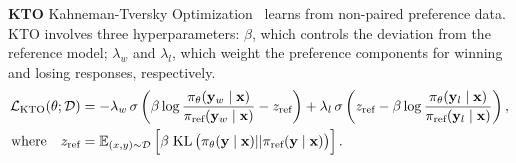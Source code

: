 \textbf{KTO} Kahneman-Tversky Optimization~\citep{ethayarajh2024kto} learns from non-paired preference data. 
KTO involves three hyperparameters: $\beta$, which controls the deviation from the reference model; $\lambda_w$ and $\lambda_l$, which weight the preference components for winning and losing responses, respectively. 
\begin{equation}
\begin{split}
\mathcal{L}_{\rm{KTO}}({\theta}; \mathcal{D}) &= -\lambda_w \,\sigma \left( \beta \log \frac{\pi_\theta(\mathbf{y}_w\mid \mathbf{x})}{\pi_{\text{ref}}(\mathbf{y}_w\mid \mathbf{x})} - z_{\text{ref}} \right) +  \lambda_l \,\sigma \left( z_{\text{ref}} - \beta \log \frac{\pi_\theta(\mathbf{y}_l\mid \mathbf{x})}{\pi_{\text{ref}}(\mathbf{y}_l\mid \mathbf{x})} \right), \\
\text{where} \quad z_{\text{ref}} &= \mathbb{E}_{(x, y) \sim \mathcal{D}} \left[\beta \;\mathrm{KL}\left( \pi_\theta(\mathbf{y}\mid \mathbf{x}) || \pi_{\text{ref}}(\mathbf{y}\mid \mathbf{x}) \right)  \right].
\end{split}
\end{equation}




